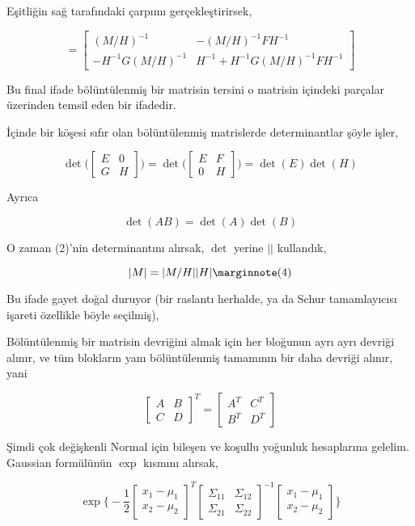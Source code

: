 \documentclass[12pt,fleqn]{article}\usepackage{../../common}
\begin{document}
Eşitliğin sağ tarafındaki çarpımı gerçekleştirirsek, 

$$ =
\left[\begin{array}{rr}
(M/H)^{-1} & -(M/H)^{-1}FH^{-1} \\
-H^{-1}G(M/H)^{-1} & H^{-1}+H^{-1}G(M/H)^{-1}FH^{-1} 
\end{array}\right]
 $$

Bu final ifade bölüntülenmiş bir matrisin tersini o matrisin içindeki parçalar
üzerinden temsil eden bir ifadedir. 

İçinde bir köşesi sıfır olan bölüntülenmiş matrislerde determinantlar şöyle
işler,

$$ 
\det \bigg(
\left[\begin{array}{rr}
E & 0 \\
G & H
\end{array}\right]
\bigg) 
= 
\det \bigg(
\left[\begin{array}{rr}
E & F \\
0 & H
\end{array}\right] 
\bigg) =
\det(E)\det(H)
 $$

Ayrıca 

$$ \det(AB) = \det(A)\det(B) $$

O zaman (2)'nin determinantını alırsak, $\det$ yerine $||$ kullandık, 

$$ |M| = |M/H||H| 
\mlabel{4}
$$

Bu ifade gayet doğal duruyor (bir raslantı herhalde, ya da Schur tamamlayıcısı 
işareti özellikle böyle seçilmiş),

Bölüntülenmiş bir matrisin devriğini almak için her bloğunun ayrı ayrı devriği
alınır, ve tüm blokların yanı bölüntülenmiş tamamının bir daha devriği alınır,
yani

$$ 
\left[\begin{array}{rr}
A & B \\ C & D 
\end{array}\right]^T = 
\left[\begin{array}{rr}
A^T & C^T \\ B^T & D^T
\end{array}\right]
 $$

Şimdi çok değişkenli Normal için bileşen ve koşullu yoğunluk hesaplarına
gelelim. Gaussian formülünün $\exp$ kısmını alırsak, 

$$ \exp 
\bigg\{ 
-\frac{ 1}{2}
\left[\begin{array}{r}
x_1 - \mu_1\\
x_2 - \mu_2
\end{array}\right]^T
\left[\begin{array}{rr}
\Sigma_{11} & \Sigma_{12}\\
\Sigma_{21} & \Sigma_{22}
\end{array}\right]^{-1}
\left[\begin{array}{r}
x_1 - \mu_1\\
x_2 - \mu_2
\end{array}\right]
\bigg\}
$$
\end{document}
